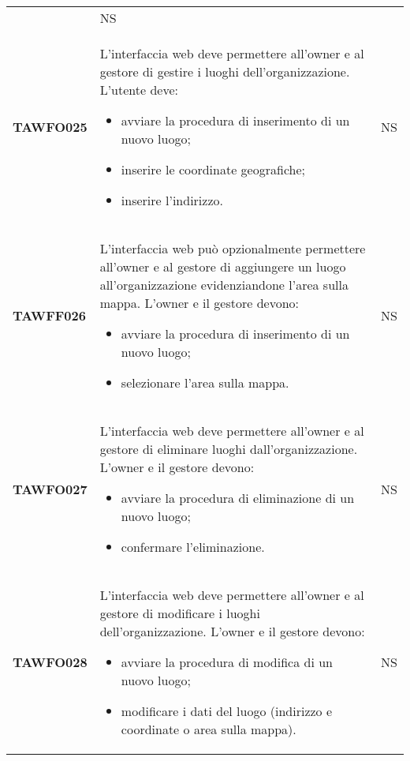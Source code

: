 \documentclass[../piano-di-qualifica.tex]{subfiles}
\begin{document}
\begin{centering}
\begin{longtable}[H]{>{\centering\bfseries}m{3cm} >{}p{10cm} >{\centering\arraybackslash}m{3cm}}
\begin{itemize}
        \end{itemize}
        & NS \\
        TAWFO025      & L’interfaccia web deve permettere all’owner e al gestore di gestire i luoghi dell’organizzazione.         \newline
        L’utente deve:
        \begin{itemize}
         \item avviare la procedura di inserimento di un nuovo luogo;
         \item inserire le coordinate geografiche;
         \item inserire l'indirizzo.
        \end{itemize}
        & NS \\
        TAWFF026      & L’interfaccia web può opzionalmente permettere all’owner e al
        gestore di aggiungere un luogo all’organizzazione evidenziandone
        l’area sulla mappa. \newline
        L’owner e il gestore devono:
        \begin{itemize}
         \item avviare la procedura di inserimento di un nuovo luogo;
         \item selezionare l'area sulla mappa.
        \end{itemize}
        & NS \\
        TAWFO027      & L’interfaccia web deve permettere all’owner e al gestore di eliminare luoghi dall’organizzazione. \newline
        L’owner e il gestore devono:
        \begin{itemize}
         \item avviare la procedura di eliminazione di un nuovo luogo;
         \item confermare l'eliminazione.
        \end{itemize}
        & NS \\
        TAWFO028      & L’interfaccia web deve permettere all’owner e al gestore di modificare i luoghi dell’organizzazione. \newline
        L’owner e il gestore devono:
        \begin{itemize}
         \item avviare la procedura di modifica di un nuovo luogo;
         \item modificare i dati del luogo (indirizzo e coordinate o area sulla mappa).
        \end{itemize}
        & NS \\

\end{longtable}
\end{centering}
\end{document}
